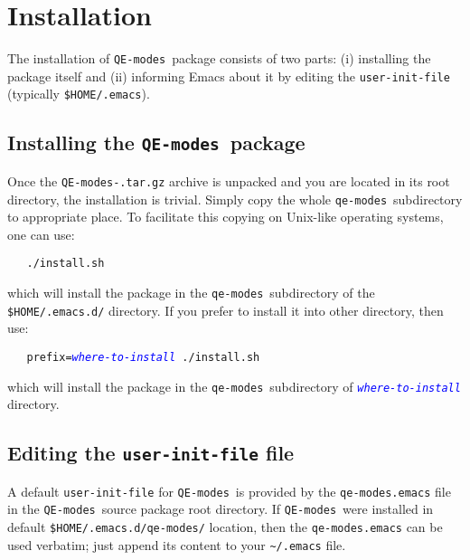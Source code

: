 \documentclass[12pt,a4paper]{article}
\def\QEmodes{\texttt{QE-modes}}
\def\qemodes{\texttt{qe-modes}}
\def\var#1{\textcolor{Blue}{\texttt{\textit{#1}}}}
\begin{document}
\section{Installation}

The installation of \QEmodes\ package consists of two parts: (i)
installing the package itself and (ii) informing Emacs about it by
editing the \verb+user-init-file+ (typically \verb+$HOME/.emacs+).

\subsection{Installing the \QEmodes\ package}
Once the \texttt{QE-modes-\version.tar.gz} archive is unpacked and you
are located in its root directory, the installation is trivial. Simply
copy the whole \qemodes\ subdirectory to appropriate place. To
facilitate this copying on Unix-like operating systems, one can use:
\begin{verbatim}
   ./install.sh
\end{verbatim}
which will install the package in the \qemodes\ subdirectory of the
\texttt{\$HOME/.emacs.d/} directory. If you prefer to install it into
other directory, then use:
\begin{flushleft}
\verb+   prefix=+\var{where-to-install}\verb+ ./install.sh+
\end{flushleft}
which will install the package in the \qemodes\ subdirectory of
\var{where-to-install} directory.


\subsection{Editing the \texttt{user-init-file} file}

A default \texttt{user-init-file} for \QEmodes\ is provided by the
\texttt{qe-modes.emacs} file in the \QEmodes\ source package root
directory. If \QEmodes\ were installed in default
\verb+$HOME/.emacs.d/qe-modes/+ location, then the
\texttt{qe-modes.emacs} can be used verbatim; just append its content
to your \verb+~/.emacs+ file.
\end{document}

